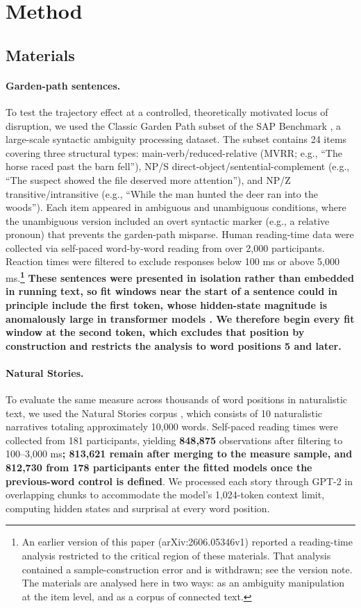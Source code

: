 \documentclass[12pt]{article}
\newcommand{\new}[1]{{\bfseries #1}}
\begin{document}
\section{Method}

\subsection{Materials}

\paragraph{Garden-path sentences.} To test the trajectory effect at a controlled, theoretically motivated locus of disruption, we used the Classic Garden Path subset of the SAP Benchmark \citep{huang2024}, a large-scale syntactic ambiguity processing dataset. The subset contains 24 items covering three structural types: main-verb/reduced-relative (MVRR; e.g., ``The horse raced past the barn fell''), NP/S direct-object/sentential-complement (e.g., ``The suspect showed the file deserved more attention''), and NP/Z transitive/intransitive (e.g., ``While the man hunted the deer ran into the woods''). Each item appeared in ambiguous and unambiguous conditions, where the unambiguous version included an overt syntactic marker (e.g., a relative pronoun) that prevents the garden-path misparse. Human reading-time data were collected via self-paced word-by-word reading from over 2,000 participants. Reaction times were filtered to exclude responses below 100 ms or above 5,000 ms.\new{\footnote{An earlier version of this paper (arXiv:2606.05346v1) reported a reading-time analysis restricted to the critical region of these materials. That analysis contained a sample-construction error and is withdrawn; see the version note. The materials are analysed here in two ways: as an ambiguity manipulation at the item level, and as a corpus of connected text.}} \new{These sentences were presented in isolation rather than embedded in running text, so fit windows near the start of a sentence could in principle include the first token, whose hidden-state magnitude is anomalously large in transformer models \citep{xiao2023}. We therefore begin every fit window at the second token, which excludes that position by construction and restricts the analysis to word positions 5 and later.}

\paragraph{Natural Stories.} To evaluate the same measure across thousands of word positions in naturalistic text, we used the Natural Stories corpus \citep{futrell2018}, which consists of 10 naturalistic narratives totaling approximately 10,000 words. Self-paced reading times were collected from 181 participants, yielding \new{848,875} observations after filtering to 100--3,000 ms\new{; 813,621 remain after merging to the measure sample, and 812,730 from 178 participants enter the fitted models once the previous-word control is defined}. We processed each story through GPT-2 in overlapping chunks to accommodate the model's 1,024-token context limit, computing hidden states and surprisal at every word position.
\end{document}
